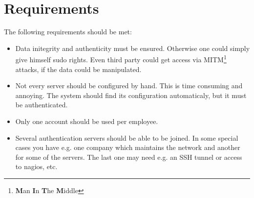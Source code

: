 %
%
%
%
%
%
%


\section{Requirements}

The following requirements should be met:

\begin{itemize}
	\item Data initegrity and authenticity must be ensured. Otherwise one could
		simply give himself sudo rights. Even third party could get access via
		MITM\footnote{\textbf{M}an \textbf{I}n \textbf{T}he \textbf{M}iddle}
		attacks, if the data could be manipulated.
	\item Not every server should be configured by hand. This is time consuming
		and annoying. The system should find its configuration automaticaly, but
		it must be authenticated.
	\item Only one account should be used per employee.
	\item Several authentication servers should be able to be joined. In some
		special cases you have e.g. one company which maintains the network and
		another for some of the servers. The last one may need e.g. an SSH
		tunnel or access to nagios, etc.
\end{itemize}
